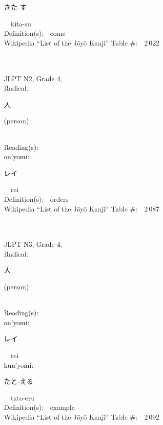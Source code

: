 \begin{multicols}{2}
{\hspace*{2em}}{\begin{CJK}{UTF8}{min} きた-す \end{CJK}}\ \ kita-su\ \ \\
Definition(s):\ \ come \\
Wikipedia ``List of the J\=oy\=o Kanji'' Table \#:\ \ 2\,022 \\
\ \ \\
{\fontsize{34pt}{40pt}  }\ \ \\  %
{JLPT N2, Grade 4, \\Radical:\ \ {\begin{CJK}{UTF8}{min} 人 \end{CJK}} (person) } \\
Reading(s):\ \ \\
{\hspace*{1em}}on'yomi:\ \ \\
{\hspace*{2em}}{\begin{CJK}{UTF8}{min} レイ \end{CJK}}\ \ rei\ \ \\
Definition(s):\ \ orders \\
Wikipedia ``List of the J\=oy\=o Kanji'' Table \#:\ \ 2\,087 \\
\ \ \\
{\fontsize{34pt}{40pt}  }\ \ \\  %
{JLPT N3, Grade 4, \\Radical:\ \ {\begin{CJK}{UTF8}{min} 人 \end{CJK}} (person) } \\
Reading(s):\ \ \\
{\hspace*{1em}}on'yomi:\ \ \\
{\hspace*{2em}}{\begin{CJK}{UTF8}{min} レイ \end{CJK}}\ \ rei\ \ \\
{\hspace*{1em}}kun'yomi:\ \ \\
{\hspace*{2em}}{\begin{CJK}{UTF8}{min} たと-える \end{CJK}}\ \ tato-eru\ \ \\
Definition(s):\ \ example \\
Wikipedia ``List of the J\=oy\=o Kanji'' Table \#:\ \ 2\,092 \\
\ \ \\
\end{multicols}


